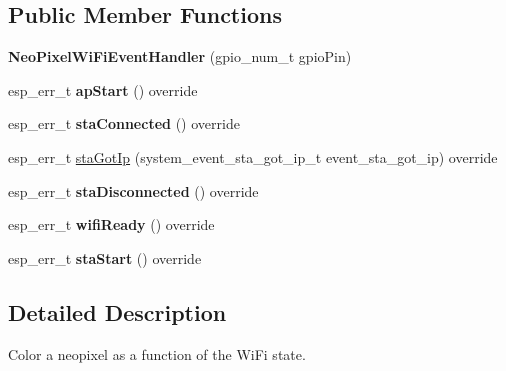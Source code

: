 \subsection*{Public Member Functions}
\begin{DoxyCompactItemize}
\item 
{\bfseries Neo\+Pixel\+Wi\+Fi\+Event\+Handler} (gpio\+\_\+num\+\_\+t gpio\+Pin)\hypertarget{class_neo_pixel_wi_fi_event_handler_a821464c5875f6551f21108c613559022}{}\label{class_neo_pixel_wi_fi_event_handler_a821464c5875f6551f21108c613559022}

\item 
esp\+\_\+err\+\_\+t {\bfseries ap\+Start} () override\hypertarget{class_neo_pixel_wi_fi_event_handler_a0fac3188d6fc34c614e6ba60e8b06b8e}{}\label{class_neo_pixel_wi_fi_event_handler_a0fac3188d6fc34c614e6ba60e8b06b8e}

\item 
esp\+\_\+err\+\_\+t {\bfseries sta\+Connected} () override\hypertarget{class_neo_pixel_wi_fi_event_handler_ad7cdba5def110a1d1af2e4b82c6b9c06}{}\label{class_neo_pixel_wi_fi_event_handler_ad7cdba5def110a1d1af2e4b82c6b9c06}

\item 
esp\+\_\+err\+\_\+t \hyperlink{class_neo_pixel_wi_fi_event_handler_a3e9dffc7ccc2fab6e202695e53e3283a}{sta\+Got\+Ip} (system\+\_\+event\+\_\+sta\+\_\+got\+\_\+ip\+\_\+t event\+\_\+sta\+\_\+got\+\_\+ip) override
\item 
esp\+\_\+err\+\_\+t {\bfseries sta\+Disconnected} () override\hypertarget{class_neo_pixel_wi_fi_event_handler_a5de1c8ee6259a4963f28283244f434ca}{}\label{class_neo_pixel_wi_fi_event_handler_a5de1c8ee6259a4963f28283244f434ca}

\item 
esp\+\_\+err\+\_\+t {\bfseries wifi\+Ready} () override\hypertarget{class_neo_pixel_wi_fi_event_handler_a38e6ae3aed1d5a777c756a859a055676}{}\label{class_neo_pixel_wi_fi_event_handler_a38e6ae3aed1d5a777c756a859a055676}

\item 
esp\+\_\+err\+\_\+t {\bfseries sta\+Start} () override\hypertarget{class_neo_pixel_wi_fi_event_handler_a6961359273cba39f9e2c979746dfd57f}{}\label{class_neo_pixel_wi_fi_event_handler_a6961359273cba39f9e2c979746dfd57f}

\end{DoxyCompactItemize}


\subsection{Detailed Description}
Color a neopixel as a function of the Wi\+Fi state. 

